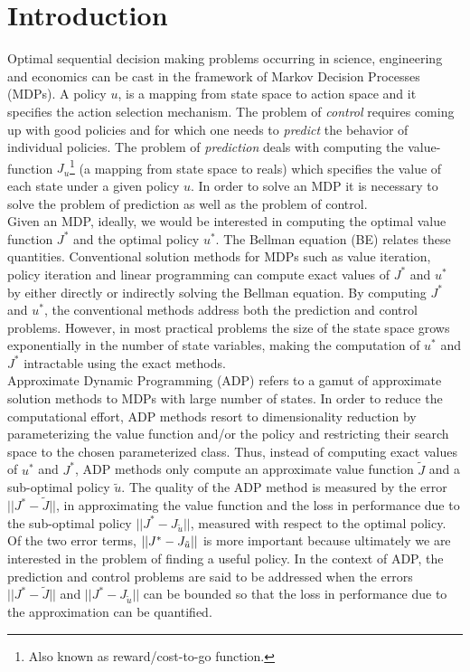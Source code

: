 \section{Introduction}\label{intro}
Optimal sequential decision making problems occurring in science, engineering and economics can be cast in the framework of Markov Decision Processes (MDPs). A policy $u$, is a mapping from state space to action space and it specifies the action selection mechanism. The problem of \emph{control} requires coming up with good policies and for which one needs to \emph{predict} the behavior of individual policies. The problem of \emph{prediction} deals with computing the value-function $J_u$\footnote{Also known as reward/cost-to-go function.} (a mapping from state space to reals) which specifies the value of each state under a given policy $u$. In order to solve an MDP it is necessary to solve the problem of prediction as well as the problem of control.\\
Given an MDP, ideally, we would be interested in computing the optimal value function $J^*$ and the optimal policy $u^*$. The Bellman equation (BE) relates these quantities. Conventional solution methods for MDPs \cite{BertB} such as value iteration, policy iteration and linear programming can compute exact values of $J^*$ and $u^*$ by either directly or indirectly solving the Bellman equation. By computing $J^*$ and $u^*$, the conventional methods address both the prediction and control problems. However, in most practical problems the size of the state space grows exponentially in the number of state variables, making the computation of $u^*$ and $J^*$ intractable using the exact methods.\\
Approximate Dynamic Programming (ADP) \cite{dpchapter,powell} refers to a gamut of approximate solution methods to MDPs with large number of states. In order to reduce the computational effort, ADP methods resort to dimensionality reduction by parameterizing the value function and/or the policy and restricting their search space to the chosen parameterized class. Thus, instead of computing exact values of $u^*$ and $J^*$, ADP methods only compute an approximate value function $\tilde{J}$ and a sub-optimal policy $\tilde{u}$. The quality of the ADP method is measured by the error $||J^*-\tilde{J}||$, in approximating the value function and the loss in performance due to the sub-optimal policy $||J^*-J_{\tilde{u}}||$, measured with respect to the optimal policy. Of the two error terms, $||J^*-J_{\tilde{u}}||$ is more important because ultimately we are interested in the problem of finding a useful policy. In the context of ADP, the prediction and control problems are said to be addressed when the errors $||J^*-\tilde{J}||$ and $||J^*-J_{\tilde{u}}||$ can be bounded so that the loss in performance due to the approximation can be quantified.\\
